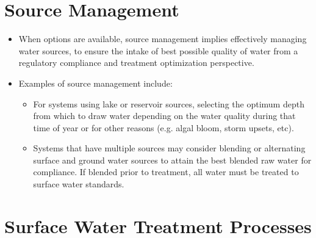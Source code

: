 \begin{itemize}
\begin{enumerate}
\begin{itemize}
\end{itemize}



\end{enumerate}
\vspace{1cm}

\section{Source Management}
\begin{itemize}
\item When options are available, source management implies effectively managing water sources, to ensure the intake of best possible quality of water from a regulatory compliance and treatment optimization perspective.
\item Examples of source management include:
\begin{itemize}
\item For systems using lake or reservoir sources, selecting the optimum depth from which to draw water depending on the water quality during that time of year or for other reasons (e.g. algal bloom,
storm upsets, etc).
\item Systems that have multiple sources may consider blending or alternating surface and ground
water sources to attain the best blended raw water for compliance. If blended prior to treatment, all water must be treated to surface water standards.
\end{itemize}
\end{itemize}

\section{Surface Water Treatment Processes}

\end{itemize}
